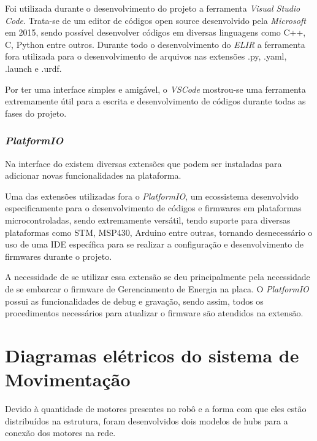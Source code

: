 Foi utilizada durante o desenvolvimento do projeto a ferramenta \textit{Visual Studio Code}. Trata-se de um editor de códigos open source desenvolvido pela \textit{Microsoft} em 2015, sendo possível desenvolver códigos em diversas linguagens como C++, C, Python entre outros. Durante todo o desenvolvimento do \textit{ELIR} a ferramenta fora utilizada para o desenvolvimento de arquivos nas extensões .py, .yaml, .launch e .urdf.  

Por ter uma interface simples e amigável, o \textit{VSCode} mostrou-se uma ferramenta extremamente útil para a escrita e desenvolvimento de códigos durante todas as fases do projeto. 

\subsubsection{\textit{PlatformIO}}
Na interface do \textit{} existem diversas extensões que podem ser instaladas para adicionar novas funcionalidades na plataforma.

Uma das extensões utilizadas fora o \textit{PlatformIO}, um ecossistema desenvolvido especificamente para o desenvolvimento de códigos e firmwares em plataformas microcontroladas, sendo extremamente versátil, tendo suporte para diversas plataformas como STM, MSP430, Arduino entre outras, tornando desnecessário o uso de uma IDE específica para se realizar a configuração e desenvolvimento de firmwares durante o projeto.

A necessidade de se utilizar essa extensão se deu principalmente pela necessidade de se embarcar o firmware de Gerenciamento de Energia na placa. O \textit{PlatformIO} possui as funcionalidades de debug e gravação, sendo assim, todos os procedimentos necessários para atualizar o firmware são atendidos na extensão.







\section{Diagramas elétricos do sistema de Movimentação}
\label{sec:diage}
Devido à quantidade de motores presentes no robô e a forma com que eles estão distribuídos na estrutura, foram desenvolvidos dois modelos de hubs para a conexão dos motores na rede.


